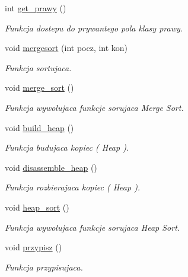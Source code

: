 \begin{DoxyCompactItemize}
int \hyperlink{classstos__tablica_aa8c6fdb7c9214f9235dbc896a9c53581}{get\-\_\-prawy} ()
\begin{DoxyCompactList}\small\item\em Funkcja dostepu do prywantego pola klasy prawy. \end{DoxyCompactList}\item 
void \hyperlink{classstos__tablica_a79d983833ba1481654c51787bb604936}{mergesort} (int pocz, int kon)
\begin{DoxyCompactList}\small\item\em Funkcja sortujaca. \end{DoxyCompactList}\item 
void \hyperlink{classstos__tablica_afaad303fc8eef3b5c115d5da31c38bc1}{merge\-\_\-sort} ()
\begin{DoxyCompactList}\small\item\em Funkcja wywolujaca funkcje sorujaca Merge Sort. \end{DoxyCompactList}\item 
void \hyperlink{classstos__tablica_a3e932a92382d6befc649da95561b99ce}{build\-\_\-heap} ()
\begin{DoxyCompactList}\small\item\em Funkcja budujaca kopiec ( Heap ). \end{DoxyCompactList}\item 
void \hyperlink{classstos__tablica_aa3a60813771d70e2d9c8f2cab195964c}{disassemble\-\_\-heap} ()
\begin{DoxyCompactList}\small\item\em Funkcja rozbierajaca kopiec ( Heap ). \end{DoxyCompactList}\item 
void \hyperlink{classstos__tablica_a6168dfa3d54b01c4702313329112fb1d}{heap\-\_\-sort} ()
\begin{DoxyCompactList}\small\item\em Funkcja wywolujaca funkcje sorujaca Heap Sort. \end{DoxyCompactList}\item 
void \hyperlink{classstos__tablica_aac88873e08b12ea26661690feb28ea86}{przypisz} ()
\begin{DoxyCompactList}\small\item\em Funkcja przypisujaca. \end{DoxyCompactList}\end{DoxyCompactItemize}
